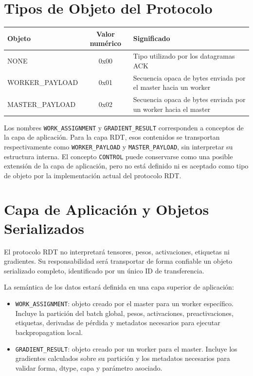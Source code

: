 \documentclass[12pt]{article}
\begin{document}
\section{Tipos de Objeto del Protocolo}

\begin{table}[h]
\centering
\begin{tabular}{|p{4.8cm}|c|p{6.7cm}|}
\hline
Objeto & Valor numérico & Significado \\
\hline
NONE & 0x00 & Tipo utilizado por los datagramas ACK \\
\hline
WORKER\_PAYLOAD & 0x01 & Secuencia opaca de bytes enviada por el master hacia un worker \\
\hline
MASTER\_PAYLOAD & 0x02 & Secuencia opaca de bytes enviada por un worker hacia el master \\
\hline
\end{tabular}
\end{table}

Los nombres \texttt{WORK\_ASSIGNMENT} y \texttt{GRADIENT\_RESULT} corresponden
a conceptos de la capa de aplicación. Para la capa RDT, esos contenidos se
transportan respectivamente como \texttt{WORKER\_PAYLOAD} y
\texttt{MASTER\_PAYLOAD}, sin interpretar su estructura interna.
El concepto \texttt{CONTROL} puede conservarse como una posible extensión de
la capa de aplicación, pero no está definido ni es aceptado como tipo de
objeto por la implementación actual del protocolo RDT.

\section{Capa de Aplicación y Objetos Serializados}

El protocolo RDT no interpretará tensores, pesos, activaciones, etiquetas ni
gradientes. Su responsabilidad será transportar de forma confiable un objeto
serializado completo, identificado por un único ID de transferencia.

La semántica de los datos estará definida en una capa superior de aplicación:

\begin{itemize}
\item \texttt{WORK\_ASSIGNMENT}: objeto creado por el master para un worker específico. Incluye la partición del batch global, pesos, activaciones, preactivaciones, etiquetas, derivadas de pérdida y metadatos necesarios para ejecutar backpropagation local.
\item \texttt{GRADIENT\_RESULT}: objeto creado por un worker para el master. Incluye los gradientes calculados sobre su partición y los metadatos necesarios para validar forma, dtype, capa y parámetro asociado.
\end{itemize}
\end{document}
